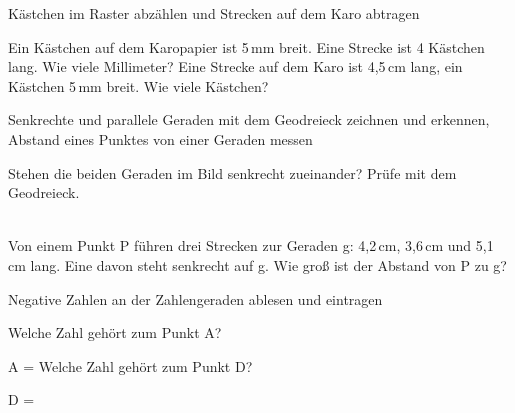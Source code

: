 \setcounter{aufgabe}{0}

\begin{aufgabe}{Kästchen im Raster abzählen und Strecken auf dem Karo abtragen}
\begin{teile}
\teil Ein Kästchen auf dem Karopapier ist 5\,mm breit. Eine Strecke ist 4 Kästchen lang. Wie viele Millimeter? \leerfeld[mm]
\teil Eine Strecke auf dem Karo ist 4{,}5\,cm lang, ein Kästchen 5\,mm breit. Wie viele Kästchen? \leerfeld[Kästchen]
\end{teile}
\end{aufgabe}

\begin{aufgabe}{Senkrechte und parallele Geraden mit dem Geodreieck zeichnen und erkennen, Abstand eines Punktes von einer Geraden messen}
\begin{teile}
\teil Stehen die beiden Geraden im Bild senkrecht zueinander? Prüfe mit dem Geodreieck. \\  \\ 

\teil Von einem Punkt P führen drei Strecken zur Geraden g: 4{,}2\,cm, 3{,}6\,cm und 5{,}1\,cm lang. Eine davon steht senkrecht auf g. Wie groß ist der Abstand von P zu g? \leerfeld[cm]
\end{teile}
\end{aufgabe}

\begin{aufgabe}{Negative Zahlen an der Zahlengeraden ablesen und eintragen}
\begin{teile}
\teil Welche Zahl gehört zum Punkt A?

A = \leerfeld
\teil Welche Zahl gehört zum Punkt D?

D = \leerfeld
\end{teile}
\end{aufgabe}

